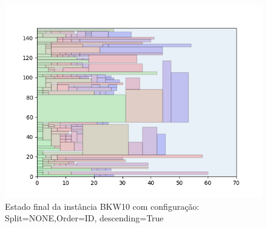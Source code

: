 \begin{figure}[H]
    \centering
    \caption[]{Estado final da instância BKW10 com configuração: Split=NONE,Order=ID, descending=True}
    \label{fig:bkw10-none-id-true}
    \includegraphics[scale=0.5]{output/figures/bkw/bkw10/none/id/true/000}
\end{figure}
